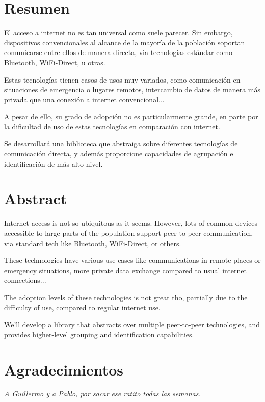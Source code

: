 \section*{Resumen}

El acceso a internet no es tan universal como suele parecer. Sin embargo,
dispositivos convencionales al alcance de la mayoría de la población soportan
comunicarse entre ellos de manera directa, via tecnologías estándar como
Bluetooth, WiFi-Direct, u otras.

Estas tecnologías tienen casos de usos muy variados, como comunicación en
situaciones de emergencia o lugares remotos, intercambio de datos de manera más
privada que una conexión a internet convencional...

A pesar de ello, su grado de adopción no es particularmente grande, en parte
por la dificultad de uso de estas tecnologías en comparación con internet.

Se desarrollará una biblioteca que abstraiga sobre diferentes tecnologías de
comunicación directa, y además proporcione capacidades de agrupación e
identificación de más alto nivel.

\clearpage

\section*{Abstract}

Internet access is not so ubiquitous as it seems. However, lots of common
devices accessible to large parts of the population support peer-to-peer
communication, via standard tech like Bluetooth, WiFi-Direct, or others.

These technologies have various use cases like communications in remote places
or emergency situations, more private data exchange compared to usual internet
connections...

The adoption levels of these technologies is not great tho, partially due to
the difficulty of use, compared to regular internet use.

We'll develop a library that abstracts over multiple peer-to-peer technologies,
and provides higher-level grouping and identification capabilities.

\clearpage

\printglossaries

\clearpage

\section*{Agradecimientos}

\emph{A Guillermo y a Pablo, por sacar ese ratito todas las semanas.}
